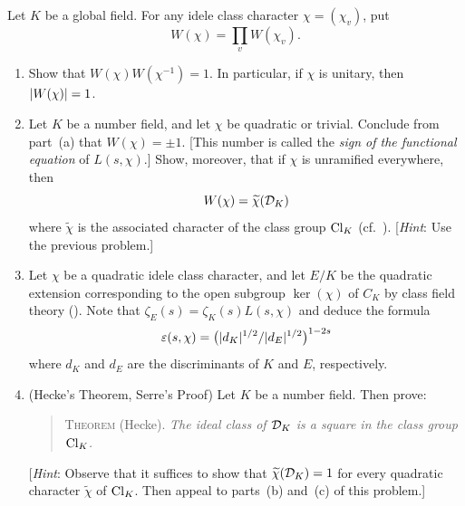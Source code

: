 
\begin{exercise}[11]
  \label{ex:ch7-11}
  Let $K$ be a global field. For any idele class character
  $\chi = (\chi_v)$, put
  \[
    W(\chi) = \prod_v W(\chi_v).
  \]
  \begin{enumerate}[label=(\alph*)]
    \item Show that $W(\chi)W(\chi^{-1}) = 1$. In particular, if $\chi$ is
      unitary, then $\lvert W(\chi)\rvert = 1$.
    \item Let $K$ be a number field, and let $\chi$ be quadratic or trivial.
      Conclude from part~(a) that $W(\chi) = \pm 1$. [This number is called
      the \emph{sign of the functional equation} of $L(s, \chi)$.] Show,
      moreover, that if $\chi$ is unramified everywhere, then
      \[
        W(\chi) = \widetilde{\chi}(\mathcal{D}_K)
      \]
      where $\widetilde{\chi}$ is the associated character of the class group
      $\operatorname{Cl}_K$ (cf.\ ). [\emph{Hint}: Use the previous
      problem.]
    \item Let $\chi$ be a quadratic idele class character, and let $E/K$ be
      the quadratic extension corresponding to the open subgroup
      $\ker(\chi)$ of $C_K$ by class field theory (). Note
      that $\zeta_E(s) = \zeta_K(s) L(s, \chi)$ and deduce the formula
      \[
        \varepsilon(s, \chi) = \bigl(\lvert d_K\rvert^{1/2} /\lvert d_E\rvert^{1/2}\bigr)^{1-2s}
      \]
      where $d_K$ and $d_E$ are the discriminants of $K$ and $E$,
      respectively.
    \item (Hecke's Theorem, Serre's Proof) Let $K$ be a number field. Then
      prove:
      \begin{quote}
        \textsc{Theorem} (Hecke). \emph{The ideal class of $\mathcal{D}_K$ is a
        square in the class group $\operatorname{Cl}_K$.}
      \end{quote}
      [\emph{Hint}: Observe that it suffices to show that
      $\widetilde{\chi}(\mathcal{D}_K) = 1$ for every quadratic character
      $\widetilde{\chi}$ of $\operatorname{Cl}_K$. Then appeal to parts~(b) and~(c) of this
      problem.]
  \end{enumerate}
\end{exercise}

